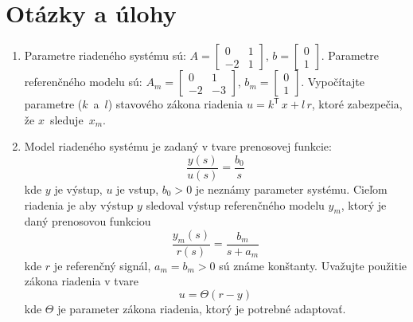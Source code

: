 \documentclass[a4paper, 10pt, ]{article}
\begin{document}
\section{Otázky a úlohy}






\begin{enumerate}[leftmargin=0pt, labelsep=4mm, itemsep=0pt]


    \item Parametre riadeného systému sú: $\displaystyle A = \begin{bmatrix} 0 & 1 \\ -2 & 1 \end{bmatrix}$, $\displaystyle b = \begin{bmatrix} 0  \\  1 \end{bmatrix}$. Parametre referenčného modelu sú: $\displaystyle A_m = \begin{bmatrix} 0 & 1 \\ -2 & -3 \end{bmatrix}$, $\displaystyle b_m = \begin{bmatrix} 0  \\  1 \end{bmatrix}$. Vypočítajte parametre ($k$~a~$l$) stavového zákona riadenia $u = k^\mathsf{T}\, x + l\,r$, ktoré zabezpečia, že $x$~sleduje~$x_m$.


    \bigskip




    \item Model riadeného systému je zadaný v tvare prenosovej funkcie:
    		\begin{equation*}
    			\frac{y(s)}{u(s)} = \frac{b_0}{s}
    		\end{equation*}
    	kde $y$ je výstup, $u$ je vstup, $b_0 > 0$ je neznámy parameter systému. Cieľom riadenia je aby výstup $y$ sledoval výstup referenčného modelu $y_m$, ktorý je daný prenosovou funkciou
    	\begin{equation*}
    			\frac{y_m(s)}{r(s)} = \frac{b_m}{s + a_m}
    		\end{equation*}
    		kde $r$ je referenčný signál, $a_m = b_m > 0$ sú známe konštanty. Uvažujte použitie zákona riadenia v tvare
    		\begin{equation*}
    			u = \Theta (r - y)
    		\end{equation*}
    		kde $\Theta$ je parameter zákona riadenia, ktorý je potrebné adaptovať.


\end{enumerate}
\end{document}
